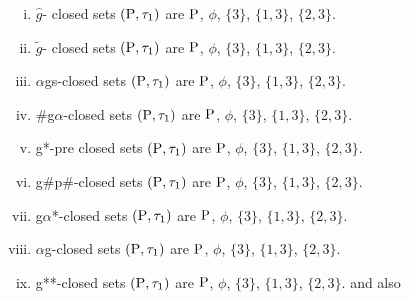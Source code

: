 \begin{exm}
\begin{enumerate}[(i)]
\item $\hat{g}$- closed sets $(\mathrm{P}, \tau_{1})$ are $\mathrm{P}$, $\phi$, $\{3\}$, $\{1, 3\}$, $\{2, 3\}$.

\item $\tilde{g}$- closed sets $(\mathrm{P}, \tau_{1})$ are $\mathrm{P}$, $\phi$, $\{3\}$, $\{1, 3\}$, $\{2, 3\}$.

\item $\alpha$gs-closed sets $(\mathrm{P}, \tau_{1})$ are $\mathrm{P}$, $\phi$, $\{3\}$, $\{1, 3\}$, $\{2, 3\}$.

\item \#g$\alpha$-closed sets $(\mathrm{P}, \tau_{1})$ are $\mathrm{P}$, $\phi$, $\{3\}$, $\{1, 3\}$, $\{2, 3\}$.

\item g*-pre closed sets $(\mathrm{P}, \tau_{1} )$ are $\mathrm{P}$, $\phi$, $\{3\}$, $\{1, 3\}$, $\{2, 3\}$.

\item g\#p\#-closed sets $(\mathrm{P}, \tau_{1} )$ are $\mathrm{P}$, $\phi$, $\{3\}$, $\{1, 3\}$, $\{2, 3\}$.

\item g$\alpha$*-closed sets $(\mathrm{P}, \tau_{1} )$ are $\mathrm{P}$, $\phi$, $\{3\}$, $\{1, 3\}$, $\{2, 3\}$.

\item $\alpha$g-closed sets $(\mathrm{P}, \tau_{1})$ are $\mathrm{P}$, $\phi$, $\{3\}$, $\{1, 3\}$, $\{2, 3\}$.

\item g{*}{*}-closed sets $(\mathrm{P}, \tau_{1})$ are $\mathrm{P}$, $\phi$, $\{3\}$, $\{1, 3\}$, $\{2, 3\}$. and also
\end{enumerate}


\end{exm}
